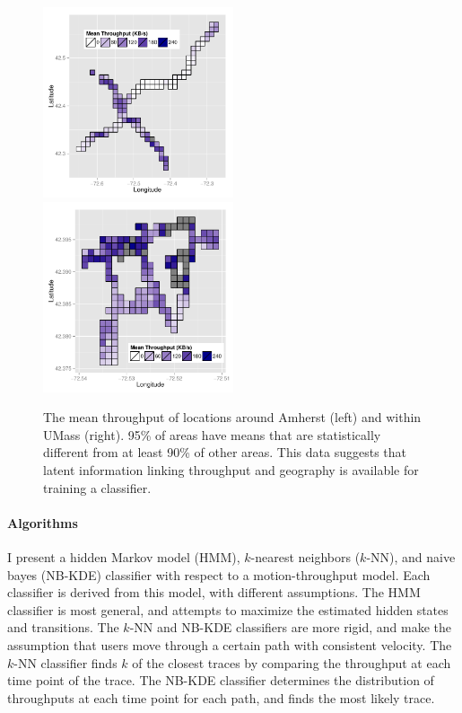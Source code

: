 \begin{figure}%
	\includegraphics[width=0.5\textwidth]{graphics/amherst_tput_map.pdf}
	\includegraphics[width=0.5\textwidth]{graphics/umass_tput_map.pdf}
	\caption{The mean throughput of locations around Amherst (left) and
		within UMass (right). 95\% of areas have means that are statistically different from at least 90\% of other areas. This data suggests that latent information linking throughput and geography is available for training a classifier. }
	\label{fig:map}
\end{figure}

\paragraph*{Algorithms}
I present a hidden Markov model (HMM), $k$-nearest neighbors ($k$-NN),
and naive bayes (NB-KDE) classifier with respect to a motion-throughput
model. Each classifier is derived from this model, with different assumptions. The HMM classifier is most general, and attempts to maximize the estimated hidden states and transitions. The $k$-NN and NB-KDE classifiers are more rigid, and make the assumption that users move through a certain path with consistent velocity. The $k$-NN classifier finds
$k$ of the closest traces by comparing the throughput at each time
point of the trace. The NB-KDE classifier determines the distribution
of throughputs at each time point for each path, and finds the most
likely trace.

